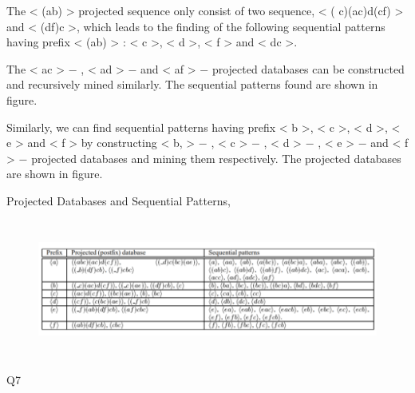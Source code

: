 \documentclass[12pt]{article}
\renewcommand{\_}{\kern-1.5pt\textunderscore\kern-1.5pt}
\begin{document}
The < (ab) > projected sequence only consist of two sequence, < ( c)(ac)d(cf) > and < (df)c >, which leads to the finding of the following sequential patterns having prefix < (ab) > : < c >, < d >, < f > and < dc >.\par

The < ac > $-$ , < ad > $-$  and < af > $-$  projected databases can be constructed and recursively mined similarly. The sequential patterns found are shown in figure.\par

Similarly, we can find sequential patterns having prefix < b >, < c >, < d >, < e > and < f > by constructing < b, > $-$ , < c > $-$ , < d > $-$ , < e > $-$  and < f > $-$  projected databases and mining them respectively. The projected databases are shown in figure.\par

Projected Databases and Sequential Patterns, \par




\begin{figure}[H]
	\begin{Center}
		\includegraphics[width=6.5in,height=1.79in]{./media/image35.png}
	\end{Center}
\end{figure}



\par


\vspace{\baselineskip}

\vspace{\baselineskip}

\vspace{\baselineskip}
\begin{Center}
{\fontsize{28pt}{33.6pt}\selectfont Q7\par}
\end{Center}\par
\end{document}
